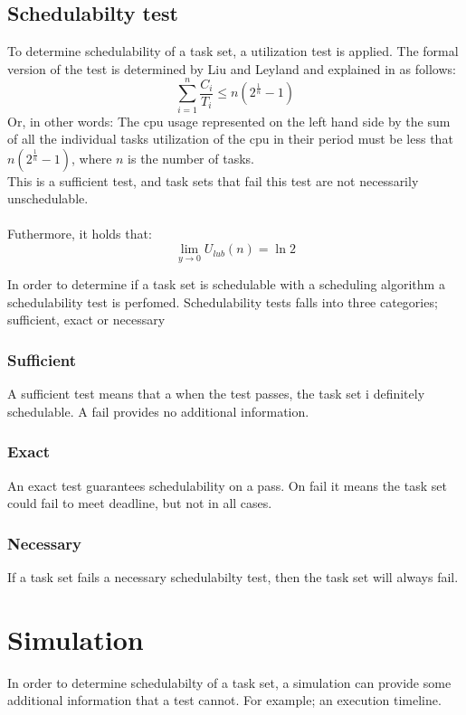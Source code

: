 \documentclass{acm_proc_article-sp}
\begin{document}
\subsection{Schedulabilty test}
To determine schedulability of a task set, a utilization test is applied. The formal version of the test is determined by Liu and Leyland and explained in \cite{CoDeKaMa2002} as follows:
\begin{equation}
\displaystyle\sum\limits_{i=1}^{n} \frac{C_i}{T_i} \leq n \left( 2^{\frac{1}{n}} - 1 \right) 
\end{equation}
Or, in other words: The cpu usage represented on the left hand side by the sum of all the individual tasks utilization of the cpu in their period must be less that $n \left( 2^{\frac{1}{n}} - 1 \right) $, where $n$ is the number of tasks.\\
This is a sufficient test, and task sets that fail this test are not necessarily unschedulable.\\\\
Futhermore, it holds that:
\begin{equation}
\underset{y\rightarrow0}{\lim}U_{lub}(n)=\ln2
\end{equation}

In order to determine if a task set is schedulable with a scheduling algorithm a schedulability test is perfomed.
Schedulability tests falls into three categories; sufficient, exact or necessary
\subsubsection*{Sufficient}
A sufficient test means that a when the test passes, the task set i definitely schedulable. A fail provides no additional information.	
\subsubsection*{Exact}
An exact test guarantees schedulability on a pass. On fail it means the task set could fail to meet deadline, but not in all cases.
\subsubsection*{Necessary}
If a task set fails a necessary schedulabilty test, then the task set will always fail.

\section{Simulation}
In order to determine schedulabilty of a task set, a simulation can provide some additional information that a test cannot. For example; an execution timeline.
\end{document}
